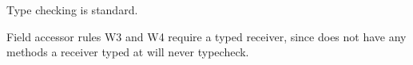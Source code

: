 \documentclass[a4paper,UKenglish,final]{tex/lipics-v2016}
\begin{document}
\begin{mathpar}
\end{mathpar}

\hrulefill

\begin{mathpar}




\end{mathpar}

\hrulefill

\begin{mathpar}


\end{mathpar}


Type checking is standard.

Field accessor rules W3 and W4 require a typed receiver, since \any does
not have any methods a receiver typed at \any will never typecheck.
\end{document}
